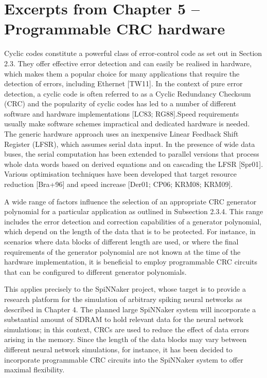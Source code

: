 \documentclass[oneside, a4paper, 11pt]{memoir}
\begin{document}
\newpage
\section{Excerpts from Chapter 5 -- Programmable CRC hardware}
Cyclic codes constitute a powerful class of error-control code as set out in Section 2.3. They offer effective error detection and can easily be realised in hardware, which makes them a popular choice for many applications that require the detection of errors, including Ethernet [TW11]. In the context of pure error detection, a cyclic code is often referred to as a Cyclic Redundancy Checksum (CRC) and the popularity of cyclic codes has led to a number of different software and hardware implementations [LC83; RG88].Speed requirements usually make software schemes impractical and dedicated hardware is needed. The generic hardware approach uses an inexpensive Linear Feedback Shift Register (LFSR), which assumes serial data input. In the presence of wide data buses, the serial computation has been extended to parallel versions that process whole data words based on derived equations and on cascading the LFSR [Spr01]. Various optimisation techniques have been developed that target resource reduction [Bra+96] and speed increase [Der01; CP06; KRM08; KRM09].

A wide range of factors influence the selection of an appropriate CRC generator polynomial for a particular application as outlined in Subsection 2.3.4. This range includes the error detection and correction capabilities of a generator polynomial, which depend on the length of the data that is to be protected. For instance, in scenarios where data blocks of different length are used, or where the final requirements of the generator polynomial are not known at the time of the hardware implementation, it is beneficial to employ programmable CRC circuits that can be configured to different generator polynomials.

This applies precisely to the SpiNNaker project, whose target is to provide a research platform for the simulation of arbitrary spiking neural networks as described in Chapter 4. The planned large SpiNNaker system will incorporate a substantial amount of SDRAM to hold relevant data for the neural network simulations; in this context, CRCs are used to reduce the effect of data errors arising in the memory. Since the length of the data blocks may vary between different neural network simulations, for instance, it has been decided to incorporate programmable CRC circuits into the SpiNNaker system to offer maximal flexibility.
\end{document}
